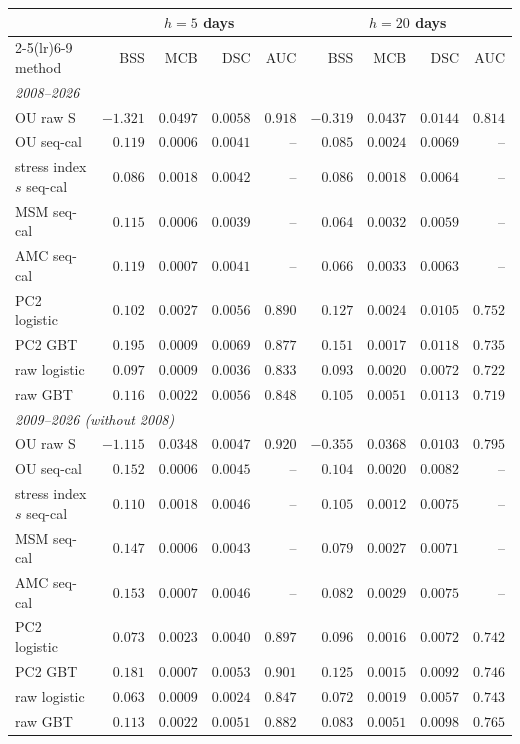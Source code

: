 \begin{tabular}{lrrrrrrrr}\toprule
 & \multicolumn{4}{c}{$h=5$ days} & \multicolumn{4}{c}{$h=20$ days}\\
\cmidrule(lr){2-5}\cmidrule(lr){6-9} method & BSS & MCB & DSC & AUC & BSS & MCB & DSC & AUC\\\midrule
\multicolumn{9}{l}{\emph{2008--2026}}\\
OU raw S & $-1.321$ & $0.0497$ & $0.0058$ & $0.918$ & $-0.319$ & $0.0437$ & $0.0144$ & $0.814$\\
OU seq-cal & $0.119$ & $0.0006$ & $0.0041$ & -- & $0.085$ & $0.0024$ & $0.0069$ & --\\
stress index $s$ seq-cal & $0.086$ & $0.0018$ & $0.0042$ & -- & $0.086$ & $0.0018$ & $0.0064$ & --\\
MSM seq-cal & $0.115$ & $0.0006$ & $0.0039$ & -- & $0.064$ & $0.0032$ & $0.0059$ & --\\
AMC seq-cal & $0.119$ & $0.0007$ & $0.0041$ & -- & $0.066$ & $0.0033$ & $0.0063$ & --\\
PC2 logistic & $0.102$ & $0.0027$ & $0.0056$ & $0.890$ & $0.127$ & $0.0024$ & $0.0105$ & $0.752$\\
PC2 GBT & $0.195$ & $0.0009$ & $0.0069$ & $0.877$ & $0.151$ & $0.0017$ & $0.0118$ & $0.735$\\
raw logistic & $0.097$ & $0.0009$ & $0.0036$ & $0.833$ & $0.093$ & $0.0020$ & $0.0072$ & $0.722$\\
raw GBT & $0.116$ & $0.0022$ & $0.0056$ & $0.848$ & $0.105$ & $0.0051$ & $0.0113$ & $0.719$\\
\multicolumn{9}{l}{\emph{2009--2026 (without 2008)}}\\
OU raw S & $-1.115$ & $0.0348$ & $0.0047$ & $0.920$ & $-0.355$ & $0.0368$ & $0.0103$ & $0.795$\\
OU seq-cal & $0.152$ & $0.0006$ & $0.0045$ & -- & $0.104$ & $0.0020$ & $0.0082$ & --\\
stress index $s$ seq-cal & $0.110$ & $0.0018$ & $0.0046$ & -- & $0.105$ & $0.0012$ & $0.0075$ & --\\
MSM seq-cal & $0.147$ & $0.0006$ & $0.0043$ & -- & $0.079$ & $0.0027$ & $0.0071$ & --\\
AMC seq-cal & $0.153$ & $0.0007$ & $0.0046$ & -- & $0.082$ & $0.0029$ & $0.0075$ & --\\
PC2 logistic & $0.073$ & $0.0023$ & $0.0040$ & $0.897$ & $0.096$ & $0.0016$ & $0.0072$ & $0.742$\\
PC2 GBT & $0.181$ & $0.0007$ & $0.0053$ & $0.901$ & $0.125$ & $0.0015$ & $0.0092$ & $0.746$\\
raw logistic & $0.063$ & $0.0009$ & $0.0024$ & $0.847$ & $0.072$ & $0.0019$ & $0.0057$ & $0.743$\\
raw GBT & $0.113$ & $0.0022$ & $0.0051$ & $0.882$ & $0.083$ & $0.0051$ & $0.0098$ & $0.765$\\
\bottomrule\end{tabular}
